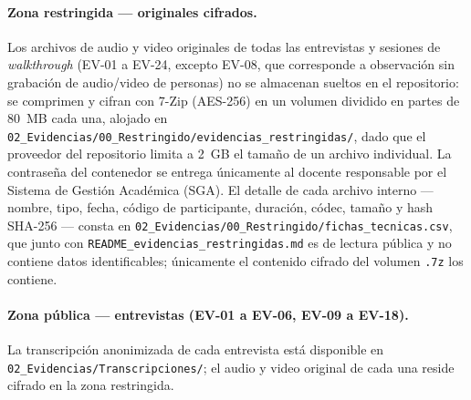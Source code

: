 \documentclass[journal,onecolumn]{IEEEtran}
\begin{document}
\paragraph{Zona restringida --- originales cifrados.}
Los archivos de audio y video originales de todas las entrevistas y sesiones
de \emph{walkthrough} (EV-01 a EV-24, excepto EV-08, que corresponde a
observación sin grabación de audio/video de personas) no se almacenan
sueltos en el repositorio: se comprimen y cifran con 7-Zip (AES-256) en un
volumen dividido en partes de 80~MB cada una, alojado en
\texttt{02\_Evidencias/00\_Restringido/evidencias\_restringidas/}, dado
que el proveedor del repositorio limita a 2~GB el tamaño de un archivo
individual. La contraseña del
contenedor se entrega únicamente al docente responsable por el Sistema de
Gestión Académica (SGA). El detalle de cada archivo interno --- nombre, tipo,
fecha, código de participante, duración, códec, tamaño y hash SHA-256 ---
consta en \texttt{02\_Evidencias/00\_Restringido/fichas\_tecnicas.csv}, que
junto con \texttt{README\_evidencias\_restringidas.md} es de lectura
pública y no contiene datos identificables; únicamente el contenido cifrado
del volumen \texttt{.7z} los contiene.
	
	\paragraph{Zona pública --- entrevistas (EV-01 a EV-06, EV-09 a EV-18).}
	La transcripción anonimizada de cada entrevista está disponible en
	\texttt{02\_Evidencias/Transcripciones/}; el audio y video original de cada
	una reside cifrado en la zona restringida.
	
\end{document}
